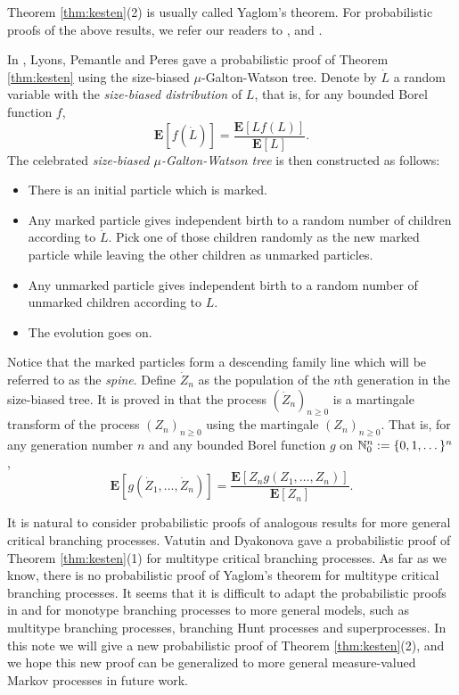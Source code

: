 \documentclass[12pt]{amsart}
\numberwithin{equation}{section}
\newcommand{\defn}[1]{{\em #1}}
\newcommand{\expr}[1]{\left( #1 \right)}
\newcommand{\brac}[1]{\left[ #1 \right]}
\newcommand{\expct}{\mathbf E}
\begin{document}
Theorem \ref{thm:kesten}(2) is usually called Yaglom's theorem.
	For probabilistic proofs of the above results, we refer our readers to 
\cite{geiger1999elementary}, \cite{geiger2000new} and \cite{lyons1995conceptual}.
\par
	In \cite{lyons1995conceptual}, Lyons, Pemantle and Peres gave a
probabilistic proof of Theorem \ref{thm:kesten} using the size-biased $\mu$-Galton-Watson tree.
	Denote by $\dot L$ a random variable with the \defn{size-biased distribution} of $L$, that is, for any bounded Borel function $f$,
\begin{equation*}
		\expct\brac{f\expr{\dot L}}
	=
		\frac{\expct\brac{Lf(L)}}{\expct\brac{L}}.
\end{equation*}
The celebrated \defn{size-biased $\mu$-Galton-Watson tree} is
then constructed as follows:
\begin{itemize}
\item
	There is an initial particle which is marked.
\item
	Any marked particle gives independent birth to a random number of children according to $\dot L$. Pick one of those children randomly as the new marked particle while leaving the other children as unmarked particles.
\item
	Any unmarked particle gives independent birth to a random number of unmarked children according to $L$.
\item
	The evolution goes on.
\end{itemize}
\par
	Notice that the marked particles form a descending family line which will be referred to as the \defn{spine}.
	Define $\dot Z_n$ as the population of the $n$th generation in the size-biased tree.
	It is proved in \cite{lyons1995conceptual} that the process $(\dot Z_n)_{n\ge 0}$ is a martingale transform of the process $(Z_n)_{n\ge 0}$ using the martingale $(Z_n)_{n\ge 0}.$
	That is, for any generation number $n$ and any bounded Borel function $g$ on
		$\mathbb N_0^{n} := \{0,1,\dots\}^n$,
\begin{equation}
\label{eq:htransformation}
				\expct\brac{g\expr{\dot Z_1,\dots,\dot Z_n}}
	=
                \frac{\expct\brac{Z_n g\expr{Z_1,\dots, Z_n}}}{\expct\brac{Z_n}}.
\end{equation}
\par
It is natural to consider probabilistic proofs of analogous results for more general
critical branching processes. Vatutin and  Dyakonova \cite{VD} gave a probabilistic proof of Theorem \ref{thm:kesten}(1) for multitype critical branching processes.
As far as we know, there is no probabilistic proof of Yaglom's theorem for
multitype critical branching processes. It seems that it is difficult to adapt
the probabilistic proofs in 
\cite{geiger2000new} and \cite{lyons1995conceptual} 
for monotype branching processes to more general models, such as multitype
branching processes, branching Hunt processes and superprocesses.
In this note we will give a new probabilistic proof of Theorem \ref{thm:kesten}(2), and we hope this new proof can be generalized to more general measure-valued Markov processes in future work.
\end{document}
